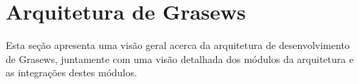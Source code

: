 \section{Arquitetura de Grasews}\label{4-grasews-arquitetura}


Esta seção apresenta uma visão geral acerca da arquitetura de desenvolvimento de Grasews, juntamente com uma visão detalhada dos módulos da arquitetura e as integrações destes módulos.



